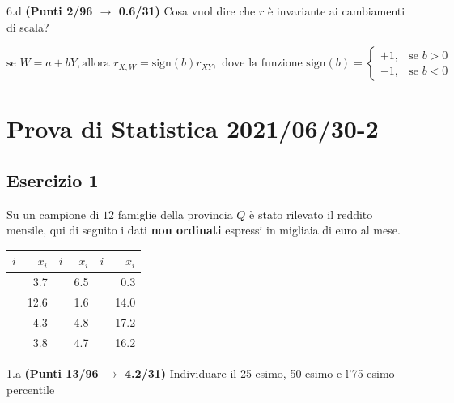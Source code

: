 \documentclass[
  11pt,
]{book}
\theoremstyle{mytheoremstyle}
\theoremstyle{mydefstyle}
\newenvironment{sol}
  {
  \begin{tcolorbox}[enhanced,breakable,arc=0.1mm,boxrule=1pt,colback=white,colframe=iblue,
  title=\bf \fontfamily{lmss}\selectfont \hspace{.5 cm} Soluzione,drop fuzzy shadow]

}{
\end{tcolorbox}
  }
\begin{document}
6.d \textbf{(Punti 2/96 \(\rightarrow\) 0.6/31)} Cosa vuol dire che \(r\) è invariante ai cambiamenti di scala?

\begin{sol}
\[\text{se }W=a+bY,\text{allora }r_{X,W}=\text{sign}(b) r_{XY},\text{ dove la funzione sign}(b)=
\begin{cases}+1, &\text{se $b>0$}\\
             -1, &\text{se $b<0$}
\end{cases}\]

\end{sol}

\section{Prova di Statistica 2021/06/30-2}\label{prova-di-statistica-20210630-2}

\subsection{Esercizio 1}\label{esercizio-1-6}

Su un campione di \(12\) famiglie della provincia \(Q\) è stato rilevato il reddito mensile, qui di seguito i dati \textbf{non ordinati} espressi in migliaia di euro al mese.

\begin{table}[H]
\centering
\begin{tabular}{>{\raggedright\arraybackslash}p{3em}r>{\raggedright\arraybackslash}p{3em}r>{\raggedright\arraybackslash}p{3em}r}
\toprule
$i$ & $x_{i}$ & $i$ & $x_{i}$ & $i$ & $x_{i}$\\
\midrule
\cellcolor[HTML]{E6E6E6}{$1$} & 3.7 & \cellcolor[HTML]{E6E6E6}{$5$} & 6.5 & \cellcolor[HTML]{E6E6E6}{$9$} & 0.3\\
\cellcolor[HTML]{E6E6E6}{$2$} & 12.6 & \cellcolor[HTML]{E6E6E6}{$6$} & 1.6 & \cellcolor[HTML]{E6E6E6}{$10$} & 14.0\\
\cellcolor[HTML]{E6E6E6}{$3$} & 4.3 & \cellcolor[HTML]{E6E6E6}{$7$} & 4.8 & \cellcolor[HTML]{E6E6E6}{$11$} & 17.2\\
\cellcolor[HTML]{E6E6E6}{$4$} & 3.8 & \cellcolor[HTML]{E6E6E6}{$8$} & 4.7 & \cellcolor[HTML]{E6E6E6}{$12$} & 16.2\\
\bottomrule
\end{tabular}
\end{table}

1.a \textbf{(Punti 13/96 \(\rightarrow\) 4.2/31)} Individuare il 25-esimo, 50-esimo e l'75-esimo percentile
\end{document}
